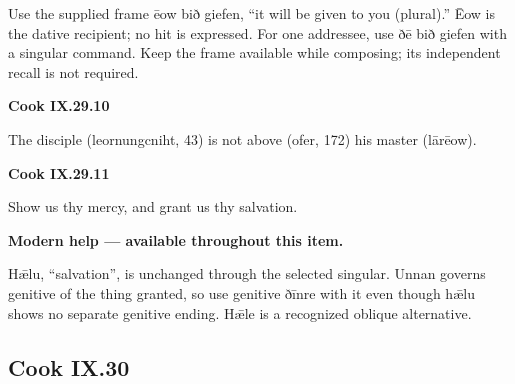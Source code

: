 Use the supplied frame ēow bið giefen, “it will be given to you (plural).” Ēow is the dative recipient; no hit is expressed. For one addressee, use ðē bið giefen with a singular command. Keep the frame available while composing; its independent recall is not required.

\par\begin{minipage}{\linewidth}\raggedright
\textbf{Cook IX.29.10}

The disciple (leornungcniht, 43) is not above (ofer, 172) his master (lārēow).

\end{minipage}\par\addvspace{4pt}

\par\begin{minipage}{\linewidth}\raggedright
\textbf{Cook IX.29.11}

Show us thy mercy, and grant us thy salvation.

\textbf{Modern help — available throughout this item.}

\end{minipage}\par\addvspace{4pt}

Hǣlu, “salvation”, is unchanged through the selected singular. Unnan governs genitive of the thing granted, so use genitive ðīnre with it even though hǣlu shows no separate genitive ending. Hǣle is a recognized oblique alternative.

\subsection*{Cook IX.30}

